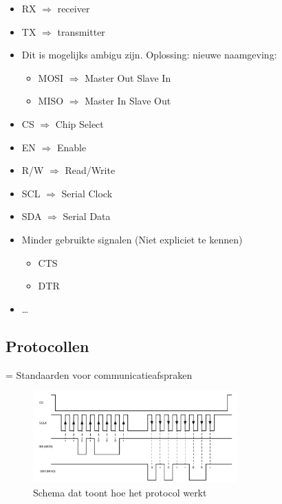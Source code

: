 \documentclass{article}
\begin{document}
\begin{itemize}
    \item RX $\Rightarrow$ receiver
    \item TX $\Rightarrow$ transmitter
    \item Dit is mogelijks ambigu zijn. Oplossing: nieuwe naamgeving:
    \begin{itemize}
        \item MOSI $\Rightarrow$ Master Out Slave In
        \item MISO $\Rightarrow$ Master In Slave Out
    \end{itemize}
    \item CS $\Rightarrow$ Chip Select
    \item EN $\Rightarrow$ Enable
    \item R/W $\Rightarrow$ Read/Write
    \item SCL $\Rightarrow$ Serial Clock
    \item SDA $\Rightarrow$ Serial Data
    \item Minder gebruikte signalen (Niet expliciet te kennen)
    \begin{itemize}
        \item CTS 
        \item DTR
    \end{itemize}
    \item \dots
\end{itemize}

\subsection{Protocollen}
= Standaarden voor communicatieafspraken

\begin{figure}[H]
    \centering
    \includegraphics[width=0.7\textwidth]{Screenshot_20200323_124324.png}
    \caption{Schema dat toont hoe het protocol werkt}
\end{figure}
\end{document}
